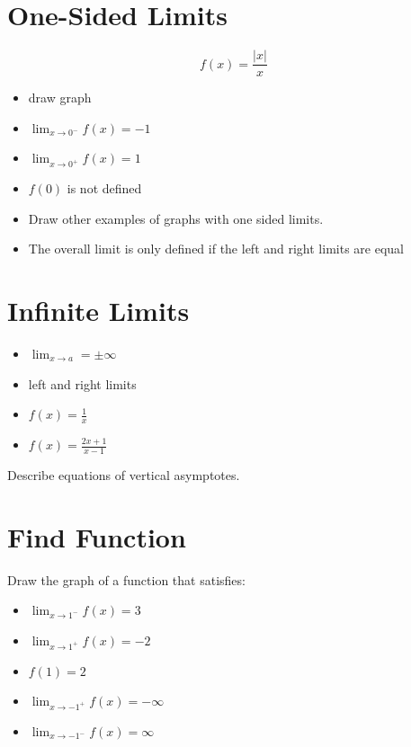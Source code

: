 \documentclass[letterpaper, landscape]{exam}
\begin{document}
  \section{One-Sided Limits}

  \[
    f(x) = \frac{|x|}{x}
  \]

  \begin{itemize}
    \item draw graph
    \item $\lim_{x \to 0^-} f(x) = -1$
    \item $\lim_{x \to 0^+} f(x) = 1$
    \item $f(0)$ is not defined
  \end{itemize}

  \begin{itemize}
    \item Draw other examples of graphs with one sided limits.
    \item The overall limit is only defined if the left and right limits are
      equal
  \end{itemize}

  \section{Infinite Limits}
  \begin{itemize}
    \item $\lim_{x \to a} = \pm \infty$
    \item left and right limits
  \end{itemize}

  \begin{itemize}
    \item $f(x) = \frac{1}{x}$
    \item $f(x) = \frac{2x + 1}{x - 1}$
  \end{itemize}

  Describe equations of vertical asymptotes.

  \section{Find Function}

  Draw the graph of a function that satisfies:
  \begin{itemize}
    \item $\lim_{x \to 1^-} f(x) =  3$
    \item $\lim_{x \to 1^+} f(x) =  -2$
    \item $f(1) = 2$
    \item $\lim_{x \to -1^+} f(x) = -\infty$
    \item $\lim_{x \to -1^-} f(x) = \infty$
  \end{itemize}
\end{document}
